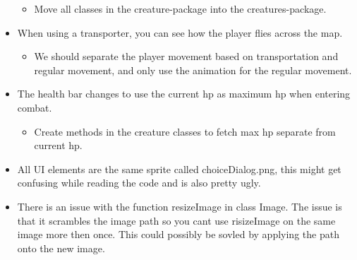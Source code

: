 \begin{itemize}[$\circ$]
\begin{itemize}[$-$]
		      \item Move all classes in the creature-package into the creatures-package.
	      \end{itemize}
	\item When using a transporter, you can see how the player flies across the map.
	      \begin{itemize}[$-$]
		      \item We should separate the player movement based on transportation and regular movement, and only use the animation for the regular movement.
	      \end{itemize}
	\item The health bar changes to use the current hp as maximum hp when entering combat.
	      \begin{itemize}[$-$]
		      \item Create methods in the creature classes to fetch max hp separate from current hp.
	      \end{itemize}
	\item All UI elements are the same sprite called choiceDialog.png, this might get confusing while reading the code and is also pretty ugly.
	\item There is an issue with the function resizeImage in class Image. The issue is that it scrambles the image path so you cant use risizeImage on the same image more then once. This could possibly be sovled by applying the path onto the new image.
\end{itemize}